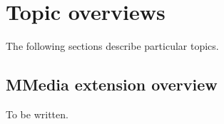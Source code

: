 \chapter{Topic overviews}\label{overviews}
%
\setfooter{\thepage}{}{}{}{}{\thepage}

The following sections describe particular topics.

\section{MMedia extension overview}\label{mmedoverview}

To be written.

